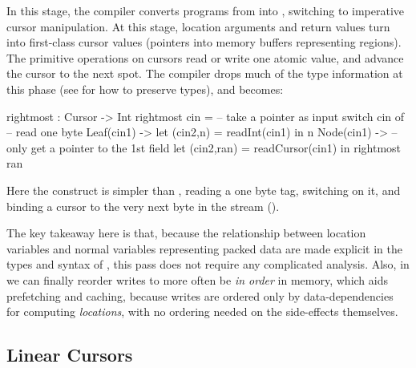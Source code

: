 In this stage, the compiler converts programs from \ourcalc{} into \lamcur{}, switching to
imperative cursor manipulation.
%
At this stage, location arguments and return values turn into first-class cursor
values (pointers into memory buffers representing regions).  The primitive
operations on cursors read or write one atomic value, and advance the cursor to
the next spot.  The compiler drops much of the type information at this phase (see  for how to preserve types), and
 becomes:
\begin{code}
rightmost : Cursor -> Int
rightmost cin =   -- take a pointer as input
  switch cin of   -- read one byte
    Leaf(cin1)  ->
      let (cin2,n) = readInt(cin1) in n
    Node(cin1)  -> -- only get a pointer to the 1st field
      let (cin2,ran) = readCursor(cin1) in
      rightmost ran
\end{code}\vspace{-1mm}
%
Here the  construct is simpler than ,
reading a one byte tag, switching on
it, and binding a cursor to the very next byte in the stream
().

%
The key takeaway here is that, because the relationship between
location variables and normal variables representing packed data are
made explicit in the types and syntax of \ourcalc{}, this pass
does not require any complicated analysis.
%
Also, in \lamcur{} we can finally reorder writes to more often be {\em in order}
in memory, which aids prefetching and caching,
because writes are ordered only by
data-dependencies for computing \emph{locations}, with no ordering needed
on the side-effects themselves.

\subsection{Linear Cursors}\label{subsec:linear}

